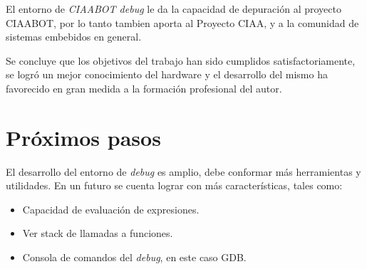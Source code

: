  

El entorno de \emph{CIAABOT debug} le da la capacidad de depuración al proyecto CIAABOT, por lo tanto tambien aporta al Proyecto CIAA, y a la comunidad de sistemas embebidos en general.

Se concluye que los objetivos del trabajo han sido cumplidos satisfactoriamente, se logró un mejor conocimiento del hardware y el desarrollo del mismo ha favorecido en
gran medida a la formación profesional del autor.


\section{Próximos pasos}

El desarrollo del entorno de \emph{debug} es amplio, debe conformar más herramientas y utilidades. En un futuro se cuenta lograr con más características, tales como: 

\begin{itemize}
	\item Capacidad de evaluación de expresiones.
	\item Ver stack de llamadas a funciones.
	\item Consola de comandos del \emph{debug}, en este caso GDB.
\end{itemize}
